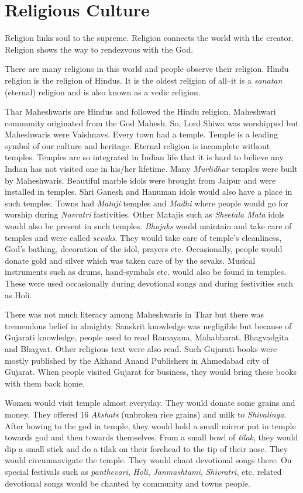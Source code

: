 \chapter{Religious Culture}
Religion links soul to the supreme. Religion connects the world with the
creator. Religion shows the way to rendezvous with the God.

There are many religions in this world and people observe their religion. Hindu
religion is the religion of Hindus. It is the oldest religion of all--it is a
\textit{sanatan} (eternal) religion and is also known as a vedic religion.

Thar Maheshwaris are Hindus and followed the Hindu religion. Maheshwari
community originated from the God Mahesh. So, Lord Shiwa was worshipped but
Maheshwaris were Vaishnavs. Every town had a temple. Temple is a leading symbol
of our culture and heritage. Eternal religion is incomplete without temples.
Temples are so integrated in Indian life that it is hard to believe any Indian
has not visited one in his/her lifetime. Many \textit{Murlidhar} temples were
built by Maheshwaris. Beautiful marble idols were brought from Jaipur and were
installed in temples. Shri Ganesh and Hanuman idols would also have a place in
such temples. Towns had \textit{Mataji} temples and \textit{Madhi} where people
would go for worship during \textit{Navratri} fastivities. Other Matajis such
as \textit{Sheetala Mata} idols would also be present in such temples.
\textit{Bhojaks} would maintain and take care of temples and were called
\textit{sevaks}. They would take care of temple's cleanliness, God's bathing,
decoration of the idol, prayers etc. Occasionally, people would donate gold and
silver which was taken care of by the sevaks. Musical instruments such as
drums, hand-symbals etc. would also be found in temples. These were used
occasionally during devotional songs and during festivities such as Holi.

There was not much literacy among Maheshwaris in Thar but there was tremendous
belief in almighty. Sanskrit knowledge was negligible but because of Gujarati
knowledge, people used to read Ramayana, Mahabharat, Bhagvadgita and Bhagvat.
Other religious text were also read. Such Gujarati books were mostly published
by the Akhand Anand Publishers in Ahmedabad city of Gujarat. When people
visited Gujarat for business, they would bring these books with them back home.

Women would visit temple almost everyday. They would donate some grains and
money. They offered 16 \textit{Akshats} (unbroken rice grains) and milk to
\textit{Shivalinga}. After bowing to the god in temple, they would hold a small
mirror put in temple towards god and then towards themselves. From a small bowl
of \textit{tilak}, they would dip a small stick and do a tilak on their
forehead to the tip of their nose. They would circumnavigate the temple. They
would chant devotional songs there. On special festivals such as
\textit{panthevari}, \textit{Holi}, \textit{Janmashtami}, \textit{Shivratri},
etc. related devotional songs would be chanted by community and towns people.

